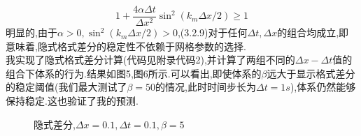 \documentclass{article}
\numberwithin{equation}{subsection}
\begin{document}
\begin{equation}
    1+\frac{4 \alpha \Delta t}{\Delta x^{2}} \sin ^{2}\left(k_{m} \Delta x / 2\right)\geq 1
\end{equation}
明显的,由于$\alpha>0,\sin ^{2}\left(k_{m} \Delta x / 2\right)>0$,(3.2.9)对于任何$\Delta t,\Delta x$的组合均成立,即意味着,隐式格式差分的稳定性不依赖于网格参数的选择.\\
我实现了隐式格式差分计算(代码见附录代码2),并计算了两组不同的$\Delta x-\Delta t$值的组合下体系的行为.结果如图5,图6所示.可以看出,即使体系的$\beta$远大于显示格式差分的稳定阈值(我们最大测试了$\beta=50$的情况,此时时间步长为$\Delta t = 1s$),体系仍然能够保持稳定.这也验证了我的预测.
\begin{figure}[H]
\centering
{}
\quad
{}
\quad
{}
\quad
{}
\caption{隐式差分,$\Delta x = 0.1,\Delta t = 0.1,\beta = 5$}
\end{figure}
\end{document}
